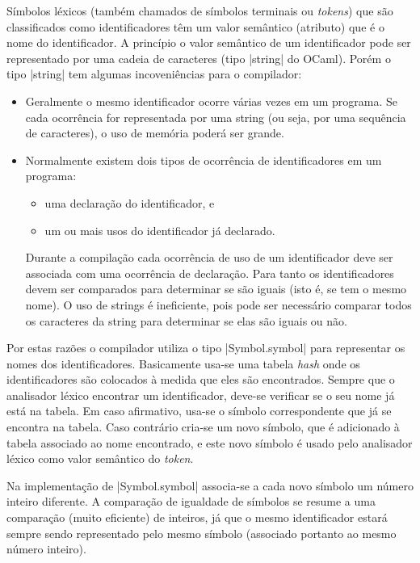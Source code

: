 \documentclass[a4paper,11pt,brazil]{article}
\begin{document}
Símbolos léxicos (também chamados de símbolos terminais ou
\emph{tokens}) que são classificados como identificadores têm um valor
semântico (atributo) que é o nome do identificador. A princípio o
valor semântico de um identificador pode ser representado por uma
cadeia de caracteres (tipo \pyginline|string| do OCaml). Porém o tipo
\pyginline|string| tem algumas incoveniências para o compilador:
\begin{itemize}
  \item Geralmente o mesmo identificador ocorre várias vezes em um
  programa. Se cada ocorrência for representada por uma string (ou
  seja, por uma sequência de caracteres), o uso de memória poderá ser
  grande.

  \item Normalmente existem dois tipos de ocorrência de
  identificadores em um programa:
  \begin{itemize}
    \item uma declaração do identificador, e
    \item um ou mais usos do identificador já declarado.
  \end{itemize}
  Durante a compilação cada ocorrência de uso de um identificador deve
  ser associada com uma ocorrência de declaração. Para tanto os
  identificadores devem ser comparados para determinar se são iguais
  (isto é, se tem o mesmo nome). O uso de strings é ineficiente, pois
  pode ser necessário comparar todos os caracteres da string para
  determinar se elas são iguais ou não.
\end{itemize}

Por estas razões o compilador utiliza o tipo \pyginline|Symbol.symbol|
para representar os nomes dos identificadores. Basicamente usa-se uma
tabela \emph{hash} onde os identificadores são colocados à medida que
eles são encontrados. Sempre que o analisador léxico encontrar um
identificador, deve-se verificar se o seu nome já está na tabela. Em
caso afirmativo, usa-se o símbolo correspondente que já se encontra na
tabela. Caso contrário cria-se um novo símbolo, que é adicionado à
tabela associado ao nome encontrado, e este novo símbolo é usado pelo
analisador léxico como valor semântico do \emph{token}.

Na implementação de \pyginline|Symbol.symbol| associa-se a cada novo
símbolo um número inteiro diferente. A comparação de igualdade de
símbolos se resume a uma comparação (muito eficiente) de inteiros, já
que o mesmo identificador estará sempre sendo representado pelo mesmo
símbolo (associado portanto ao mesmo número inteiro).
\end{document}
